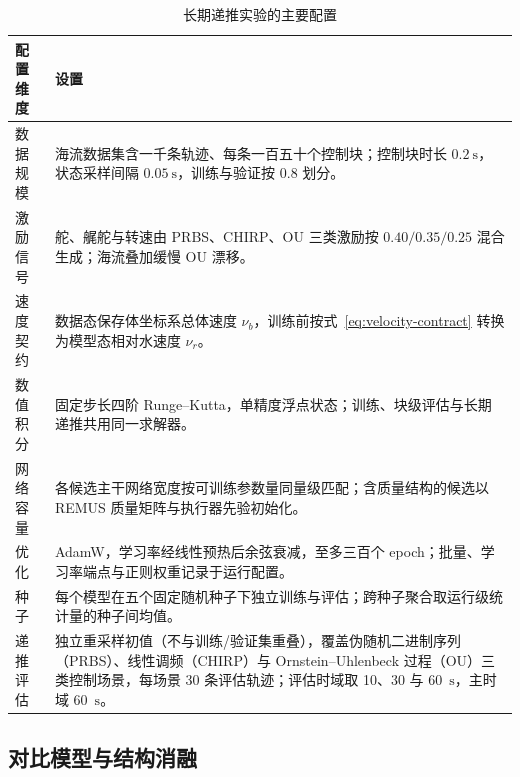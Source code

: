 \begin{table}[htbp]
  \centering
  \caption{长期递推实验的主要配置}
  \label{tab:experimental-config}
  \begin{tabularx}{\textwidth}{>{\raggedright\arraybackslash}p{}>{\raggedright\arraybackslash}X}
    \toprule
    配置维度 & 设置 \\
    \midrule
    数据规模 & 海流数据集含一千条轨迹、每条一百五十个控制块；控制块时长 \(0.2~\mathrm{s}\)，状态采样间隔 \(0.05~\mathrm{s}\)，训练与验证按 \(0.8\) 划分。 \\
    激励信号 & 舵、艉舵与转速由 PRBS、CHIRP、OU 三类激励按 \(0.40/0.35/0.25\) 混合生成；海流叠加缓慢 OU 漂移。 \\
    速度契约 & 数据态保存体坐标系总体速度 \(\nu_b\)，训练前按式~\eqref{eq:velocity-contract} 转换为模型态相对水速度 \(\nu_r\)。 \\
    数值积分 & 固定步长四阶 Runge--Kutta，单精度浮点状态；训练、块级评估与长期递推共用同一求解器。 \\
    网络容量 & 各候选主干网络宽度按可训练参数量同量级匹配；含质量结构的候选以 REMUS 质量矩阵与执行器先验初始化。 \\
    优化 & AdamW，学习率经线性预热后余弦衰减，至多三百个 epoch；批量、学习率端点与正则权重记录于运行配置。 \\
    种子 & 每个模型在五个固定随机种子下独立训练与评估；跨种子聚合取运行级统计量的种子间均值。 \\
    递推评估 & 独立重采样初值（不与训练/验证集重叠），覆盖伪随机二进制序列（PRBS）、线性调频（CHIRP）与 Ornstein--Uhlenbeck 过程（OU）三类控制场景，每场景 30 条评估轨迹；评估时域取 10、30 与 60~\(\mathrm{s}\)，主时域 60~\(\mathrm{s}\)。 \\
    \bottomrule
  \end{tabularx}
\end{table}

\subsection{对比模型与结构消融}
\label{subsec:models-ablations}

